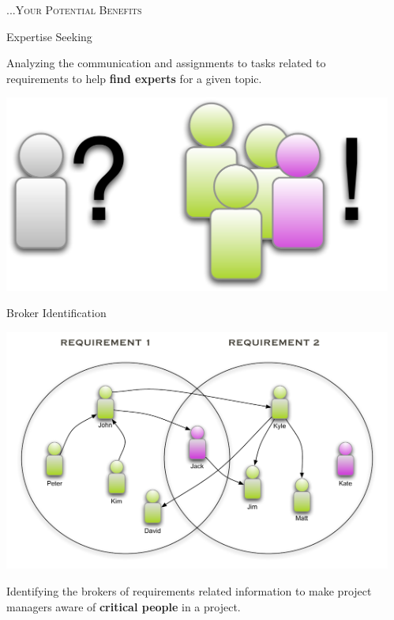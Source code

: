 \documentclass[final]{beamer} %
\newcommand{\marker}[1]{\textbf{\color{knaccentcolor1} #1}}
\begin{document}
\begin{frame}{}
\begin{columns}[t]
\begin{column}{.45\linewidth}
\end{column}
\begin{column}{.45\linewidth}

{\Large  \color{white} \textsc{\hfill ...Your Potential Benefits}}

    \begin{block}{Expertise Seeking}
    \begin{minipage}[c]{.8\linewidth}
    Analyzing the communication and assignments to tasks related to requirements to help \marker{find experts} for a given topic.
    \end{minipage}  
    \hspace{\columnsep}
    \begin{minipage}[c]{.15\linewidth}
    \includegraphics[width=\linewidth]{img/expert-seeking}
    \end{minipage}
    \end{block}

    \vspace{2\columnsep}
    \begin{block}{Broker Identification}   
    \begin{minipage}[c]{.4\linewidth}
    \raggedleft
    \includegraphics[width=\linewidth]{img/broker}
    \end{minipage}  
    \hspace{\columnsep}
    \begin{minipage}[c]{.5\linewidth}
  Identifying the brokers of requirements related information to make project managers aware of \marker{critical people} in a project.
    \end{minipage}
    

\end{block}
\end{column}
\end{columns}
\end{frame}
\end{document}

